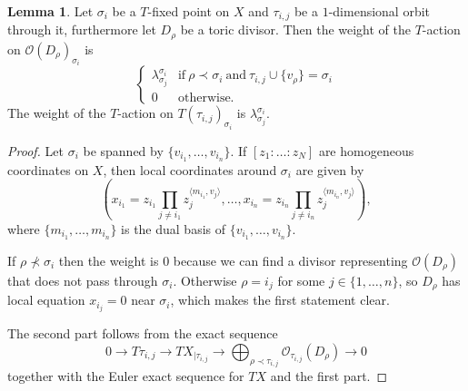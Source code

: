\documentclass[11pt]{amsart}
\renewcommand{\to}{\rightarrow}
\theoremstyle{definition}
\newtheorem{lem}[thm]{Lemma}
\theoremstyle{definition}
\begin{document}
\begin{lem}
 Let $\sigma_i$ be a $T$-fixed point on $X$ and $\tau_{i,j}$ be a $1$-dimensional orbit through it, furthermore let $D_\rho$ be a toric divisor. Then the weight of the $T$-action on $\mathcal O(D_\rho)_{\sigma_i}$ is
 \[
  \begin{cases}
      \lambda^{\sigma_i}_{\sigma_j} & \text{if}\ \rho\prec \sigma_i\  \text{and}\  \tau_{i,j}\cup\{v_\rho\}=\sigma_i \\
      0 & \text{otherwise.}
    \end{cases}
 \]
The weight of the $T$-action on $T(\tau_{i,j})_{\sigma_i}$ is $\lambda^{\sigma_i}_{\sigma_j}$.
\end{lem}
\begin{proof}
 Let $\sigma_i$ be spanned by $\{v_{i_1},\ldots,v_{i_n}\}$. If $[z_1:\ldots:z_N]$ are homogeneous coordinates on $X$, then local coordinates around $\sigma_i$ are given by \[\left(x_{i_1}=z_{i_1}\prod_{j\neq i_1}z_j^{\langle m_{i_1},v_j\rangle},\ldots,x_{i_n}=z_{i_n}\prod_{j\neq i_n}z_j^{\langle m_{i_n},v_j\rangle}\right),\] where $\{m_{i_1},\ldots,m_{i_n}\}$ is the dual basis of $\{v_{i_1},\ldots,v_{i_n}\}$.
 
 If $\rho\nprec \sigma_i$ then the weight is $0$ because we can find a divisor representing $\mathcal O(D_\rho)$ that does not pass through $\sigma_i$. Otherwise $\rho=i_j$ for some $j\in\{1,\ldots,n\}$, so $D_{\rho}$ has local equation $x_{i_j}=0$ near $\sigma_i$, which makes the first statement clear.
 
 The second part follows from the exact sequence
 \[
  0\to T\tau_{i,j}\to TX_{|\tau_{i,j}}\to \bigoplus_{\rho\prec\tau_{i,j}}\mathcal O_{\tau_{i,j}}(D_{\rho})\to 0
 \]
together with the Euler exact sequence for $TX$ and the first part.
\end{proof}
\end{document}
